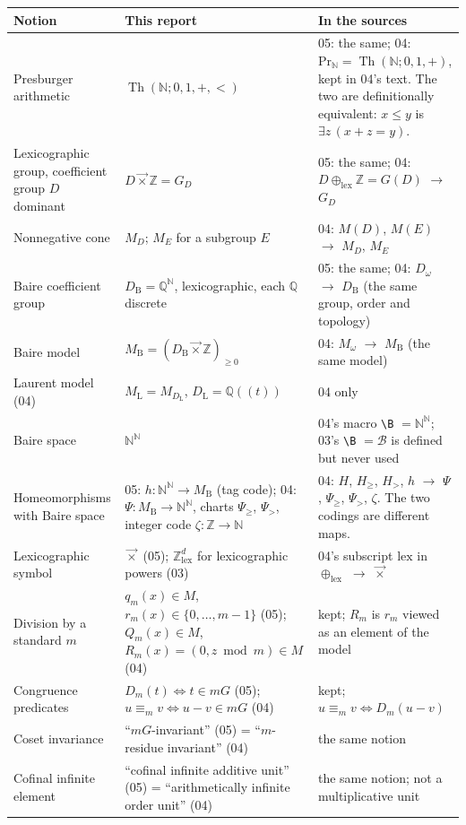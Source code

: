 \documentclass[11pt]{article}
\numberwithin{equation}{section}
\theoremstyle{definition}
\theoremstyle{remark}
\newcommand{\N}{\mathbb N}
\newcommand{\Z}{\mathbb Z}
\newcommand{\Q}{\mathbb Q}
\newcommand{\Baire}{\N^{\N}}
\newcommand{\lex}{\mathbin{\overrightarrow\times}}
\newcommand{\MB}{M_{\mathrm B}}
\newcommand{\GD}{G_D}
\newcommand{\MD}{M_D}
\newcommand{\Th}{\operatorname{Th}}
\newcommand{\ML}{M_{\mathrm L}}
\begin{document}
\begin{center}\small
\begin{longtable}{@{}P{.27\textwidth}P{.30\textwidth}P{.37\textwidth}@{}}
\toprule
Notion & This report & In the sources\\
\midrule
\endhead
Presburger arithmetic & $\Th(\N;0,1,+,<)$ & 05: the same; 04: $\mathrm{Pr}_{\N}=\Th(\N;0,1,+)$, kept in 04's text. The two are definitionally equivalent: $x\le y$ is $\exists z\,(x+z=y)$.\\
Lexicographic group, coefficient group $D$ dominant & $D\lex\Z=\GD$ & 05: the same; 04: $D\oplus_{\mathrm{lex}}\Z=G(D)$ $\to$ $\GD$\\
Nonnegative cone & $\MD$; $M_E$ for a subgroup $E$ & 04: $M(D)$, $M(E)$ $\to$ $\MD$, $M_E$\\
Baire coefficient group & $D_{\mathrm B}=\Q^{\N}$, lexicographic, each $\Q$ discrete & 05: the same; 04: $D_\omega$ $\to$ $D_{\mathrm B}$ (the same group, order and topology)\\
Baire model & $\MB=(D_{\mathrm B}\lex\Z)_{\ge0}$ & 04: $M_\omega$ $\to$ $\MB$ (the same model)\\
Laurent model (04) & $\ML=M_{D_{\mathrm L}}$, $D_{\mathrm L}=\Q((t))$ & 04 only\\
Baire space & $\Baire$ & 04's macro \texttt{\textbackslash B} $=\N^{\N}$; 03's \texttt{\textbackslash B} $=\mathcal B$ is defined but never used\\
Homeomorphisms with Baire space & 05: $h:\Baire\to\MB$ (tag code); 04: $\Psi:\MB\to\Baire$, charts $\Psi_{\ge}$, $\Psi_{>}$, integer code $\zeta:\Z\to\N$ & 04: $H$, $H_{\ge}$, $H_{>}$, $h$ $\to$ $\Psi$, $\Psi_{\ge}$, $\Psi_{>}$, $\zeta$. The two codings are different maps.\\
Lexicographic symbol & $\lex$ (05); $\Z^d_{\mathrm{lex}}$ for lexicographic powers (03) & 04's subscript $\mathrm{lex}$ in $\oplus_{\mathrm{lex}}$ $\to$ $\lex$\\
Division by a standard $m$ & $q_m(x)\in M$, $r_m(x)\in\{0,\dots,m-1\}$ (05); $Q_m(x)\in M$, $R_m(x)=(0,z\bmod m)\in M$ (04) & kept; $R_m$ is $r_m$ viewed as an element of the model\\
Congruence predicates & $D_m(t)\iff t\in mG$ (05); $u\equiv_m v\iff u-v\in mG$ (04) & kept; $u\equiv_m v\iff D_m(u-v)$\\
Coset invariance & ``$mG$-invariant'' (05) = ``$m$-residue invariant'' (04) & the same notion\\
Cofinal infinite element & ``cofinal infinite additive unit'' (05) = ``arithmetically infinite order unit'' (04) & the same notion; not a multiplicative unit\\

\end{longtable}
\end{center}
\end{document}
